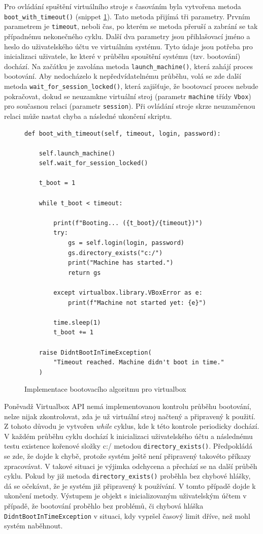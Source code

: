 \documentclass[thesis=M,czech,hidelinks]{FITthesis}[2013/05/06]
\begin{document}
Pro ovládání spuštění virtuálního stroje s časováním byla vytvořena metoda \texttt{boot_with_timeout()} (snippet \ref{snip:vboxboot}). Tato metoda přijímá tři parametry. Prvním parametrem je \texttt{timeout}, neboli čas, po kterém se metoda přeruší a zabrání se tak případnému nekonečného cyklu. Další dva parametry jsou přihlašovací jméno a heslo do uživatelského účtu ve virtuálním systému. Tyto údaje jsou potřeba pro inicializaci uživatele, ke které v průběhu spouštění systému (tzv. bootování) dochází. Na začátku je zavolána metoda \texttt{launch_machine()}, která zahájí proces bootování. Aby nedocházelo k nepředvídatelnému průběhu, volá se zde další metoda \texttt{wait_for_session_locked()}, která zajišťuje, že bootovací proces nebude pokračovat, dokud se neuzamkne virtuální stroj (parametr \texttt{machine} třídy \texttt{Vbox}) pro současnou relaci (parametr \texttt{session}). Při ovládání stroje skrze neuzamčenou relaci může nastat chyba a následné ukončení skriptu. 
\begin{figure}[h]               
	\begin{verbatim}
def boot_with_timeout(self, timeout, login, password):

    self.launch_machine()
    self.wait_for_session_locked()

    t_boot = 1

    while t_boot < timeout:

        print(f"Booting... ({t_boot}/{timeout})")
        try:
            gs = self.login(login, password)
            gs.directory_exists("c:/")
            print("Machine has started.")
            return gs

        except virtualbox.library.VBoxError as e:
            print(f"Machine not started yet: {e}")

        time.sleep(1)
        t_boot += 1

    raise DidntBootInTimeException(
        "Timeout reached. Machine didn't boot in time."
    )
	\end{verbatim}      
	\caption{Implementace bootovacího algoritmu pro virtualbox}
	\label{snip:vboxboot}
\end{figure}


Poněvadž Virtualbox API nemá implementovanou kontrolu průběhu bootování, nelze nijak zkontrolovat, zda je už virtuální stroj načtený a připravený k použití. Z tohoto důvodu je vytvořen \textit{while} cyklus, kde k této kontrole periodicky dochází. V každém průběhu cyklu dochází k inicializaci uživatelského účtu a následnému testu existence kořenové složky c:/ metodou \texttt{directory_exists()}. Předpokládá se zde, že dojde k chybě, protože systém ještě není připravený takovéto příkazy zpracovávat. V takové situaci je výjimka odchycena a přechází se na další průběh cyklu. Pokud by již metoda \texttt{directory_exists()} proběhla bez chybové hlášky, dá se očekávat, že je systém již připravený k používání. V tomto případě dojde k ukončení metody. Výstupem je objekt s inicializovaným uživatelským účtem v případě, že bootování proběhlo bez problémů, či chybová hláška \texttt{DidntBootInTimeException} v situaci, kdy vypršel časový limit dříve, než mohl systém naběhnout.
\end{document}
